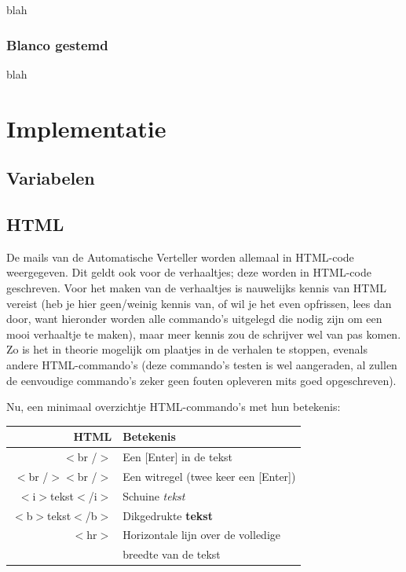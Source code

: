 \documentclass[12pt]{article}
\begin{document}
      blah
    
    \subsubsection{Blanco gestemd}
    
      blah
      
\newpage
  
\section{Implementatie}

  \subsection{Variabelen}\label{subsec:Variabelen}

  \subsection{HTML}
  
  De mails van de Automatische Verteller worden allemaal in HTML-code weergegeven. Dit geldt ook voor de verhaaltjes; deze worden in HTML-code geschreven. Voor het maken van de verhaaltjes is nauwelijks kennis van HTML vereist (heb je hier geen/weinig kennis van, of wil je het even opfrissen, lees dan door, want hieronder worden alle commando's uitgelegd die nodig zijn om een mooi verhaaltje te maken), maar meer kennis zou de schrijver wel van pas komen. Zo is het in theorie mogelijk om plaatjes in de verhalen te stoppen, evenals andere HTML-commando's (deze commando's testen is wel aangeraden, al zullen de eenvoudige commando's zeker geen fouten opleveren mits goed opgeschreven).
  
  Nu, een minimaal overzichtje HTML-commando's met hun betekenis:
  
    \begin{center}
      \begin{tabular}{r|l}
        HTML & Betekenis \\
        \hline
        $<$br /$>$ & Een [Enter] in de tekst \\
        $<$br /$><$br /$>$ & Een witregel (twee keer een [Enter]) \\
        $<$i$>$tekst$<$/i$>$ & Schuine \emph{tekst} \\
        $<$b$>$tekst$<$/b$>$ & Dikgedrukte \textbf{tekst} \\
        $<$hr$>$ & Horizontale lijn over de volledige \\
         & breedte van de tekst \\ 
      \end{tabular}
    \end{center}
  
\end{document}
